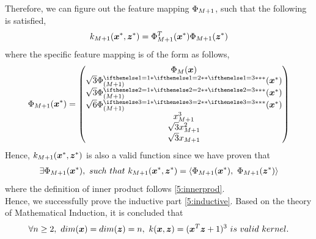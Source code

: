 \documentclass[11pt,a4paper]{article}
\newcommand{\htab}{\hspace*{0.63cm}}
\newcommand{\bs}[1]{\boldsymbol{#1}}
\begin{document}
Therefore, we can figure out the feature mapping $\Phi_{M+1}$, such that the following is satisfied,
    \begin{align}
        \knew = \PhiMM^{T}(\xxp) \PhiMM(\zzp)
    \end{align}
\htab where the specific feature mapping is of the form as follows, 
    \begin{align}
    \PhiMM (\xxp) = 
    \begin{pmatrix} \PhiM(\xx) \\ \sqrt{3}\PhiMMs{1}(\xxp) \\ 
        \sqrt{3}\PhiMMs{2}(\xxp) \\ \sqrt{6}\PhiMMs{3}(\xxp) \\
            x_{M+1}^{3} \\ \sqrt{3} x_{M+1}^{2} \\ \sqrt{3} x_{M+1} 
        \end{pmatrix}
    \end{align}
\htab Hence, $\knew$ is also a valid function since we have proven that
    \begin{align}
        \exists \PhiMM(\xxp),\ such\ that\ \knew = \langle \PhiMM(\xxp),\ \PhiMM(\zzp) \rangle
    \end{align}
\htab where the definition of inner product follows \eqref{5:innerprod}. \\[0.1cm]
\htab Hence, we successfully prove the inductive part \eqref{5:inductive}. Based on the theory of Mathematical Induction, it is concluded that 
    \begin{align}
        \forall n \geq 2,\ dim(\xx) = dim(\zz) = n,\ \kernel = (\xx^{T} \zz + 1)^{3} \ is \ valid\ kernel.
    \end{align}
\newpage
\newcommand{\unikernel}{k(x,z)}
\newcommand{\uniPhix}{\bs{\Phi}(x)}
\newcommand{\uniPhiz}{\bs{\Phi}(z)}
\end{document}
